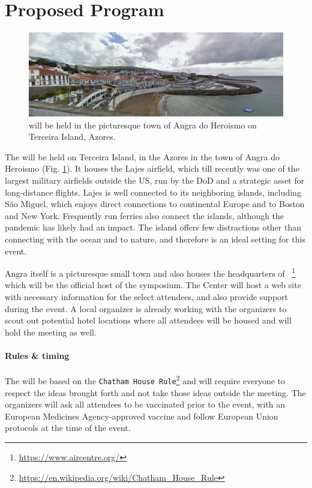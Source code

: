\section{Proposed Program}
\label{sec:pgm}

\begin{figure}[!h]
  \centering
  \includegraphics[scale=0.5]{fig/angra.png}
  \caption{\symp will be held in the picturesque town of Angra do
    Heroismo on Terceira Island, Azores.}
  \label{fig:angra}
\end{figure}

The \symp will be held on Terceira Island, in the Azores in the town of
Angra do Heroismo (Fig. \ref{fig:angra}). It houses the Lajes airfield,
which till recently was one of the largest military airfields outside
the US, run by the DoD and a strategic asset for long-distance
flights. Lajes is well connected to its neighboring islands, including
S\~{a}o Miguel, which enjoys direct connections to continental Europe
and to Boston and New York. Frequently run ferries also connect the
islands, although the pandemic has likely had an impact. The island
offers few distractions other than connecting with the ocean and to
nature, and therefore is an ideal setting for this event.

Angra itself is a picturesque small town and also houses the
headquarters of \aire~\footnote{\url{https://www.aircentre.org/}} which
will be the official host of the symposium. The Center will host a web
site with necessary information for the select attendees, and also
provide support during the event. A local organizer is already working
with the organizers to scout out potential hotel locations where all
attendees will be housed and will hold the meeting as well. 

\paragraph{Rules \& timing} The \symp will be based on the
\texttt{Chatham House
  Rule}\footnote{\url{https://en.wikipedia.org/wiki/Chatham_House_Rule}}
and will require everyone to respect the ideas brought forth and not
take those ideas outside the meeting.  The organizers will ask all
attendees to be vaccinated prior to the event, with an European
Medicines Agency-approved vaccine and follow European Union protocols
at the time of the event.

